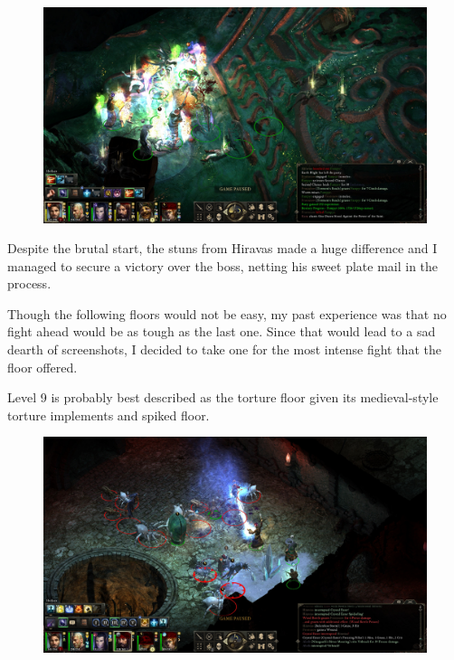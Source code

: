 \documentclass{article}
\begin{document}
\begin{figure}
\includegraphics[scale=0.33]{files/blog/2018_11_25_pillars_of_eternity_path_of_the_damned_act_ii/2018_11_25_fampyr12.jpg}
\end{figure}

Despite the brutal start, the stuns from Hiravas made a huge difference and I managed to secure a victory over the boss, netting his sweet plate mail in the process.

Though the following floors would not be easy, my past experience was that no fight ahead would be as tough as the last one.  Since that would lead to a sad dearth of screenshots, I decided to take one for the most intense fight that the floor offered.

Level 9 is probably best described as the torture floor given its medieval-style torture implements and spiked floor.

\begin{figure}
\includegraphics[scale=0.33]{files/blog/2018_11_25_pillars_of_eternity_path_of_the_damned_act_ii/2018_11_25_paths_l09.jpg}
\end{figure}
\end{document}
